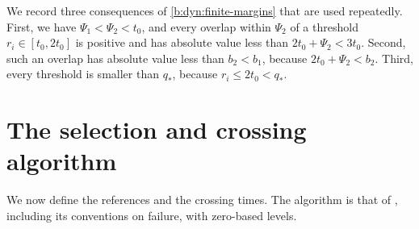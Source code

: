 We record three consequences of \eqref{b:dyn:finite-margins} that are used repeatedly. First, we have $\Psi_1<\Psi_2<t_0$, and every overlap within $\Psi_2$ of a threshold $r_i\in[t_0,2t_0]$ is positive and has absolute value less than $2t_0+\Psi_2<3t_0$. Second, such an overlap has absolute value less than $b_2<b_1$, because $2t_0+\Psi_2<b_2$. Third, every threshold is smaller than $q_*$, because $r_i\le2t_0<q_*$.

\section{The selection and crossing algorithm}\label{sec:ind-algorithm}

We now define the references and the crossing times. The algorithm is that of \cite[Section~8.4]{oai-barriers}, including its conventions on failure, with zero-based levels.

